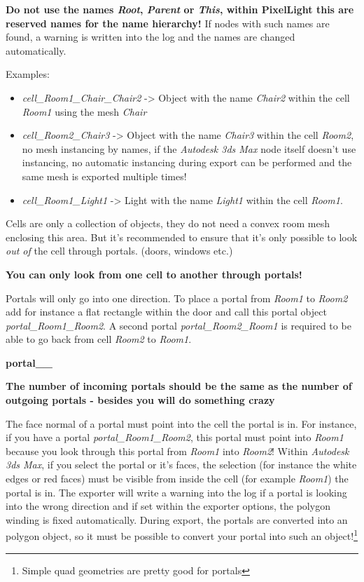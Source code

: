 \textbf{Do not use the names \emph{Root}, \emph{Parent} or \emph{This}, within PixelLight this are reserved names for the name hierarchy!} If nodes with such names are found, a warning is written into the log and the names are changed automatically.

Examples:
\begin{itemize}
\item{\emph{cell\_Room1\_Chair\_Chair2} -> Object with the name \emph{Chair2} within the cell \emph{Room1} using the mesh \emph{Chair}}
\item{\emph{cell\_Room2\_Chair3} -> Object with the name \emph{Chair3} within the cell \emph{Room2}, no mesh instancing by names, if the \emph{Autodesk 3ds Max} node itself doesn't use instancing, no automatic instancing during export can be performed and the same mesh is exported multiple times!}
\item{\emph{cell\_Room1\_Light1} -> Light with the name \emph{Light1} within the cell \emph{Room1}.}
\end{itemize}

Cells are only a collection of objects, they do not need a convex room mesh enclosing this area. But it's recommended to ensure that it's only possible to look \emph{out of} the cell through portals. (doors, windows etc.)

\textbf{You can only look from one cell to another through portals!}

Portals will only go into one direction. To place a portal from \emph{Room1} to \emph{Room2} add for instance a flat rectangle within the door and call this portal object \emph{portal\_Room1\_Room2}. A second portal \emph{portal\_Room2\_Room1} is required to be able to go back from cell \emph{Room2} to \emph{Room1}.

\textbf{portal\_<from cell>\_<to cell>}

\textbf{The number of incoming portals should be the same as the number of outgoing portals - besides you will do something crazy}

The face normal of a portal must point into the cell the portal is in. For instance, if you have a portal \emph{portal\_Room1\_Room2}, this portal must point into \emph{Room1} because you look through this portal from \emph{Room1} into \emph{Room2}! Within \emph{Autodesk 3ds Max}, if you select the portal or it's faces, the selection (for instance the white edges or red faces) must be visible from inside the cell (for example \emph{Room1}) the portal is in. The exporter will write a warning into the log if a portal is looking into the wrong direction and if set within the exporter options, the polygon winding is fixed automatically. During export, the portals are converted into an polygon object, so it must be possible to convert your portal into such an object!\footnote{Simple quad geometries are pretty good for portals}

